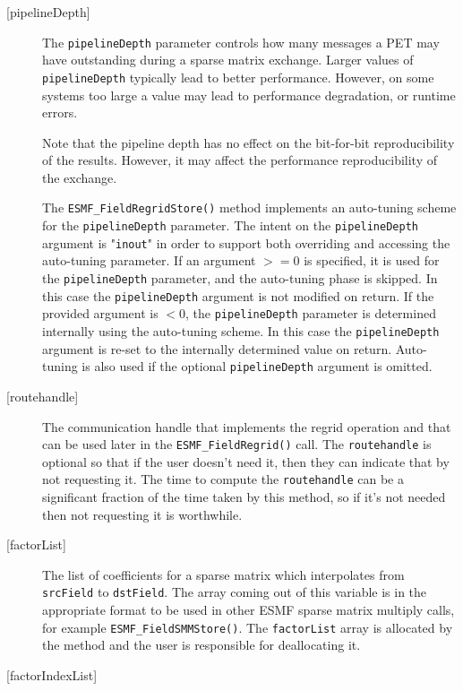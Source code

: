 \begin{description}
     \item [{[pipelineDepth]}]
       The {\tt pipelineDepth} parameter controls how many messages a PET
       may have outstanding during a sparse matrix exchange. Larger values
       of {\tt pipelineDepth} typically lead to better performance. However,
       on some systems too large a value may lead to performance degradation,
       or runtime errors.
  
       Note that the pipeline depth has no effect on the bit-for-bit
       reproducibility of the results. However, it may affect the performance
       reproducibility of the exchange.
  
       The {\tt ESMF\_FieldRegridStore()} method implements an auto-tuning scheme
       for the {\tt pipelineDepth} parameter. The intent on the 
       {\tt pipelineDepth} argument is "{\tt inout}" in order to 
       support both overriding and accessing the auto-tuning parameter.
       If an argument $>= 0$ is specified, it is used for the 
       {\tt pipelineDepth} parameter, and the auto-tuning phase is skipped.
       In this case the {\tt pipelineDepth} argument is not modified on
       return. If the provided argument is $< 0$, the {\tt pipelineDepth}
       parameter is determined internally using the auto-tuning scheme. In this
       case the {\tt pipelineDepth} argument is re-set to the internally
       determined value on return. Auto-tuning is also used if the optional 
       {\tt pipelineDepth} argument is omitted.
       \item [{[routehandle]}]
             The communication handle that implements the regrid operation and that can be used later in 
             the {\tt ESMF\_FieldRegrid()} call. The {\tt routehandle} is optional so that if the 
             user doesn't need it, then they can indicate that by not requesting it. 
             The time to compute the {\tt routehandle} can be a significant fraction of the time 
             taken by this method, so if it's not needed then not requesting it is worthwhile.  
       \item [{[factorList]}] 
             The list of coefficients for a sparse matrix which interpolates from {\tt srcField} to 
             {\tt dstField}. The array coming out of this variable is in the appropriate format to be used
             in other ESMF sparse matrix multiply calls, for example {\tt ESMF\_FieldSMMStore()}. 
             The {\tt factorList} array is allocated by the method and the user is responsible for 
             deallocating it. 
       \item [{[factorIndexList]}] 

\end{description}
